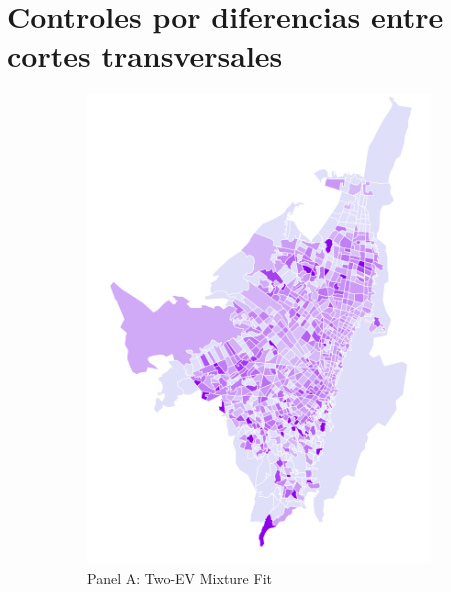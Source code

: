 \documentclass{article}
\begin{document}
\section{Controles por diferencias entre cortes transversales}
\begin{figure}[p] %
    \centering
    \begin{subfigure}[b]{0.4\textwidth}
        \includegraphics[width=\linewidth]{figs_dep_maps/mapa_dep_2011.png}
        \caption{Panel A: Two-EV Mixture Fit}
        \label{fig:panelA}
    \end{subfigure}
    \hfill
    \begin{subfigure}[b]{0.4\textwidth}

\end{subfigure}
\end{figure}
\end{document}
